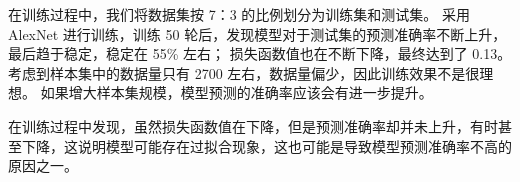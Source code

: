 \documentclass[UTF8]{ctexart}
\begin{document}
在训练过程中，我们将数据集按 7：3 的比例划分为训练集和测试集。
采用 AlexNet 进行训练，训练 50 轮后，发现模型对于测试集的预测准确率不断上升，最后趋于稳定，稳定在 55\% 左右；
损失函数值也在不断下降，最终达到了 0.13。考虑到样本集中的数据量只有 2700 左右，数据量偏少，因此训练效果不是很理想。
如果增大样本集规模，模型预测的准确率应该会有进一步提升。 \par
在训练过程中发现，虽然损失函数值在下降，但是预测准确率却并未上升，有时甚至下降，这说明模型可能存在过拟合现象，这也可能是导致模型预测准确率不高的原因之一。

\newpage
\small


\end{document}
